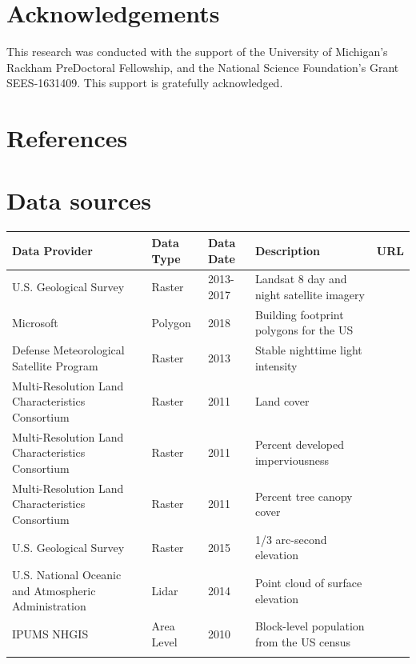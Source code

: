 \documentclass[final,3p,times,twocolumn,sort&compress]{elsarticle}
\begin{document}

\section*{Acknowledgements}
This research was conducted with the support of the University of Michigan's Rackham PreDoctoral Fellowship, and the National Science Foundation's Grant SEES-1631409. This support is gratefully acknowledged.

\section*{References}



\newpage
\onecolumn
\appendix

\section{Data sources}

\begin{tabu}to \textwidth{ X[l]  X[c]  X[c] X[l] X[l] }
 \hline
 Data Provider & Data Type & Data Date & Description & URL \\
 \hline
U.S. Geological Survey  & Raster  & 2013-2017 &
    Landsat 8 day and night satellite imagery &  \\
Microsoft  & Polygon  & 2018 & Building footprint polygons for the US &
     \\
Defense Meteorological Satellite Program  & Raster  & 2013 &
    Stable nighttime light intensity &  \\
Multi-Resolution Land Characteristics Consortium  & Raster  & 2011 &
    Land cover &  \\
Multi-Resolution Land Characteristics Consortium  & Raster  & 2011 &
    Percent developed imperviousness &  \\
Multi-Resolution Land Characteristics Consortium  & Raster  & 2011 &
    Percent tree canopy cover &  \\
U.S. Geological Survey  & Raster  & 2015 & 1/3 arc-second elevation &
     \\
U.S. National Oceanic and Atmospheric Administration  & Lidar  & 2014 & Point cloud of surface elevation &
     \\
IPUMS NHGIS  & Area Level  & 2010 &
    Block-level population from the US census & \cite{nhgis}\\
\hline
\label{tab:data}
\end{tabu}
\end{document}
